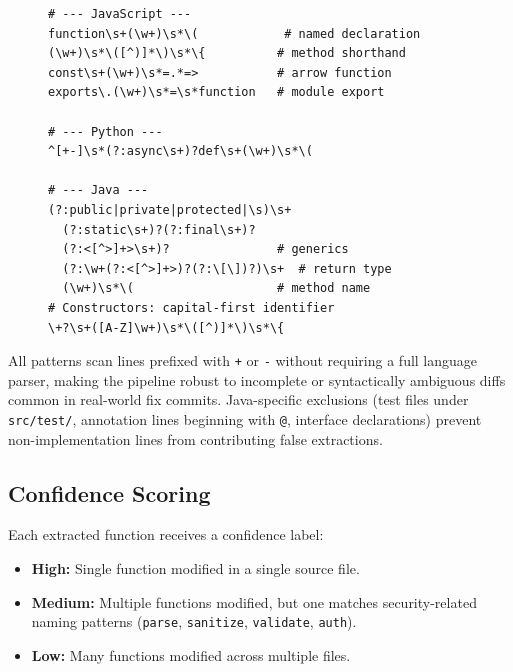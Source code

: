 \documentclass[sigconf,nonacm]{acmart}
\begin{document}
\begin{figure}[t]
\begin{lstlisting}[basicstyle=\scriptsize\ttfamily,
                   breaklines=true,
                   frame=single,
                   caption={Language-specific function extraction patterns.
                   Capture group \texttt{(name)} yields the function
                   identifier.},
                   label={fig:regex-patterns}]
# --- JavaScript ---
function\s+(\w+)\s*\(            # named declaration
(\w+)\s*\([^)]*\)\s*\{          # method shorthand
const\s+(\w+)\s*=.*=>           # arrow function
exports\.(\w+)\s*=\s*function   # module export

# --- Python ---
^[+-]\s*(?:async\s+)?def\s+(\w+)\s*\(

# --- Java ---
(?:public|private|protected|\s)\s+
  (?:static\s+)?(?:final\s+)?
  (?:<[^>]+>\s+)?               # generics
  (?:\w+(?:<[^>]+>)?(?:\[\])?)\s+  # return type
  (\w+)\s*\(                    # method name
# Constructors: capital-first identifier
\+?\s+([A-Z]\w+)\s*\([^)]*\)\s*\{
\end{lstlisting}
\end{figure}

All patterns scan lines prefixed with \texttt{+} or \texttt{-} without
requiring a full language parser, making the pipeline robust to incomplete
or syntactically ambiguous diffs common in real-world fix commits.
Java-specific exclusions (test files under \texttt{src/test/}, annotation
lines beginning with \texttt{@}, interface declarations) prevent
non-implementation lines from contributing false extractions.

\subsection{Confidence Scoring}

Each extracted function receives a confidence label:

\begin{itemize}
    \item \textbf{High:} Single function modified in a single source file.
    \item \textbf{Medium:} Multiple functions modified, but one matches 
    security-related naming patterns (\texttt{parse}, \texttt{sanitize}, 
    \texttt{validate}, \texttt{auth}).
    \item \textbf{Low:} Many functions modified across multiple files.
\end{itemize}
\end{document}
